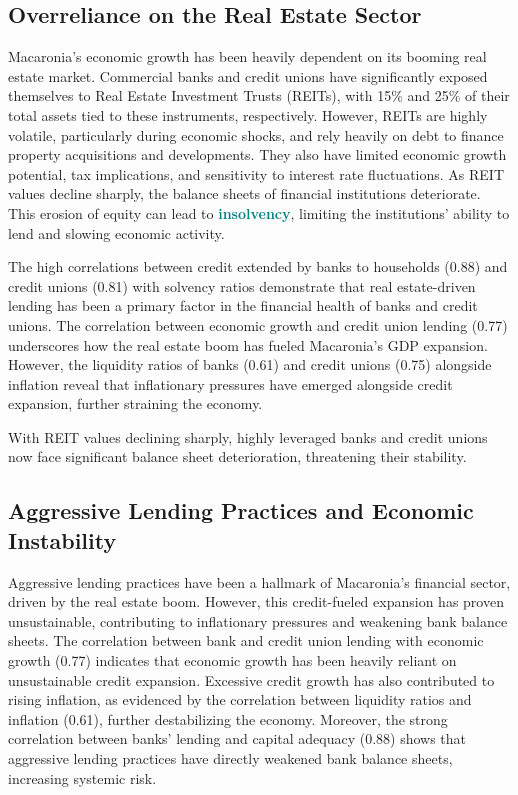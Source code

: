 \newpage

\subsection*{Overreliance on the Real Estate Sector}

Macaronia’s economic growth has been heavily dependent on its booming real estate market. Commercial banks and credit unions have significantly exposed themselves to Real Estate Investment Trusts (REITs), with 15\% and 25\% of their total assets tied to these instruments, respectively. However, REITs are highly volatile, particularly during economic shocks, and rely heavily on debt to finance property acquisitions and developments. They also have limited economic growth potential, tax implications, and sensitivity to interest rate fluctuations. As REIT values decline sharply, the balance sheets of financial institutions deteriorate. This erosion of equity can lead to \textcolor{teal}{\textbf{insolvency}}, limiting the institutions’ ability to lend and slowing economic activity.

The high correlations between credit extended by banks to households (0.88) and credit unions (0.81) with solvency ratios demonstrate that real estate-driven lending has been a primary factor in the financial health of banks and credit unions. The correlation between economic growth and credit union lending (0.77) underscores how the real estate boom has fueled Macaronia’s GDP expansion. However, the liquidity ratios of banks (0.61) and credit unions (0.75) alongside inflation reveal that inflationary pressures have emerged alongside credit expansion, further straining the economy. 

With REIT values declining sharply, highly leveraged banks and credit unions now face significant balance sheet deterioration, threatening their stability.

\subsection*{Aggressive Lending Practices and Economic Instability}

Aggressive lending practices have been a hallmark of Macaronia’s financial sector, driven by the real estate boom. However, this credit-fueled expansion has proven unsustainable, contributing to inflationary pressures and weakening bank balance sheets. The correlation between bank and credit union lending with economic growth (0.77) indicates that economic growth has been heavily reliant on unsustainable credit expansion. Excessive credit growth has also contributed to rising inflation, as evidenced by the correlation between liquidity ratios and inflation (0.61), further destabilizing the economy. Moreover, the strong correlation between banks’ lending and capital adequacy (0.88) shows that aggressive lending practices have directly weakened bank balance sheets, increasing systemic risk.

